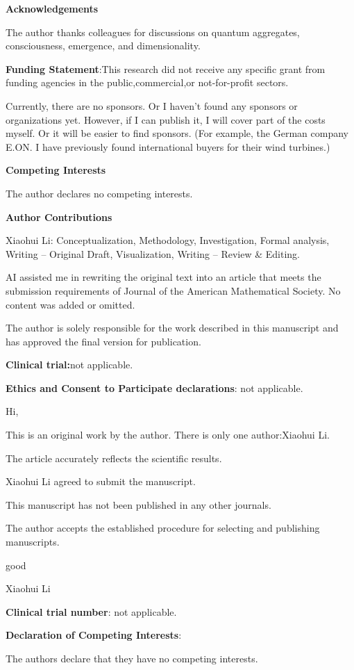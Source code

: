 \documentclass[11pt,a4paper]{article}
\begin{document}
  
  
  \textbf{\textbf{Acknowledgements}}

The author thanks colleagues for discussions on quantum aggregates, consciousness, emergence, and dimensionality. 

 \textbf{\textbf{Funding Statement}}:This research did not receive any specific grant from funding agencies in the public,commercial,or not-for-profit sectors.

Currently, there are no sponsors. Or I haven't found any sponsors or organizations yet. However, if I can publish it, I will cover part of the costs myself. Or it will be easier to find sponsors. (For example, the German company E.ON. I have previously found international buyers for their wind turbines.)

 \textbf{\textbf{Competing Interests}}

The author declares no competing interests.

 \textbf{\textbf{Author Contributions}}

Xiaohui Li: Conceptualization, Methodology, Investigation, Formal analysis, Writing – Original Draft, Visualization, Writing – Review \& Editing.

AI assisted me in rewriting the original text into an article that meets the submission requirements of Journal of the American Mathematical Society. No content was added or omitted.

 The author is solely responsible for the work described in this manuscript and has approved the final version for publication.

 \textbf{\textbf{Clinical trial:}}not applicable.

 \textbf{\textbf{Ethics and Consent to Participate declarations}}: not applicable.

 Hi,

This is an original work by the author. There is only one author:Xiaohui Li.

The article accurately reflects the scientific results.

Xiaohui Li agreed to submit the manuscript.

This manuscript has not been published in any other journals.

The author accepts the established procedure for selecting and publishing manuscripts.

good

Xiaohui Li



 \textbf{\textbf{Clinical trial number}}: not applicable.
 
 \textbf{\textbf{Declaration of Competing Interests}}: 

The authors declare that they have no competing interests.
\end{document}
